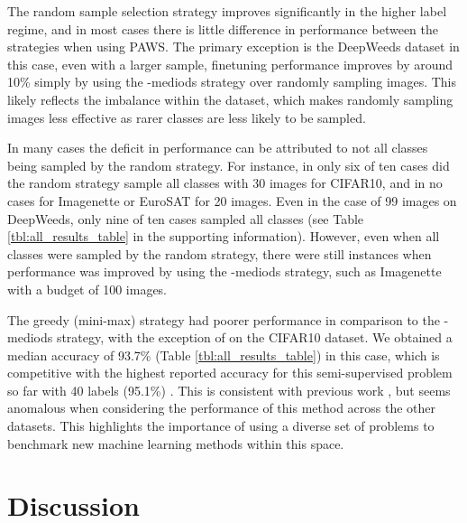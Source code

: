\documentclass{article}
\begin{document}
The random sample selection strategy improves significantly in the higher label regime, and in most cases there is little difference in performance between the strategies when using PAWS. The primary exception is the DeepWeeds dataset \textemdash{} in this case, even with a larger sample, finetuning performance improves by around 10\% simply by using the -mediods strategy over randomly sampling images. This likely reflects the imbalance within the dataset, which makes randomly sampling images less effective as rarer classes are less likely to be sampled.

In many cases the deficit in performance can be attributed to not all classes being sampled by the random strategy. For instance, in only six of ten cases did the random strategy sample all classes with 30 images for CIFAR10, and in no cases for Imagenette or EuroSAT for 20 images. Even in the case of 99 images on DeepWeeds, only nine of ten cases sampled all classes (see Table \ref{tbl:all_results_table} in the supporting information). However, even when all classes were sampled by the random strategy, there were still instances when performance was improved by using the -mediods strategy, such as Imagenette with a budget of 100 images.

The greedy (mini-max) strategy had poorer performance in comparison to the -mediods strategy, with the exception of on the CIFAR10 dataset. We obtained a median accuracy of 93.7\% (Table \ref{tbl:all_results_table}) in this case, which is competitive with the highest reported accuracy for this semi-supervised problem so far with 40 labels (95.1\%) \citep{wang2022freematch}. This is consistent with previous work \citep{sener2017active}, but seems anomalous when considering the performance of this method across the other datasets. This highlights the importance of using a diverse set of problems to benchmark new machine learning methods within this space.





























\section{Discussion}
\end{document}
